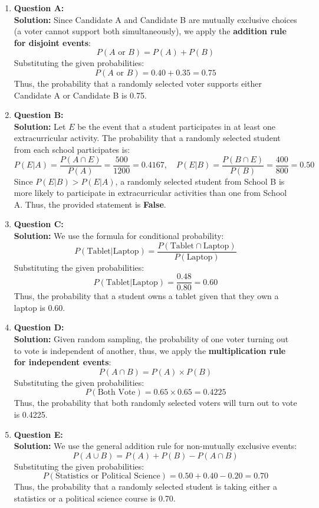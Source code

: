 \documentclass{article}
\begin{document}
\begin{enumerate}

    \item \textbf{Question A:} \\
    \textbf{Solution:} Since Candidate A and Candidate B are mutually exclusive choices (a voter cannot support both simultaneously), we apply the \textbf{addition rule for disjoint events}:
    \[
    P(A \text{ or } B) = P(A) + P(B)
    \]
    Substituting the given probabilities:
    \[
    P(A \text{ or } B) = 0.40 + 0.35 = 0.75
    \]
    Thus, the probability that a randomly selected voter supports either Candidate A or Candidate B is 0.75.

    \item \textbf{Question B:} \\
    \textbf{Solution:} Let \( E \) be the event that a student participates in at least one extracurricular activity. The probability that a randomly selected student from each school participates is:
    \[
    P(E | A) = \frac{P(A \cap E)}{P(A)} = \frac{500}{1200} = 0.4167, \quad
    P(E | B) =  \frac{P(B \cap E)}{P(B)} = \frac{400}{800} = 0.50
    \]
    Since \( P(E | B) > P(E | A) \), a randomly selected student from School B is more likely to participate in extracurricular activities than one from School A. Thus, the provided statement is \textbf{False}.

    \item \textbf{Question C:} \\
    \textbf{Solution:} We use the formula for conditional probability:
    \[
    P(\text{Tablet} | \text{Laptop}) = \frac{P(\text{Tablet} \cap \text{Laptop})}{P(\text{Laptop})}
    \]
    Substituting the given probabilities:
    \[
    P(\text{Tablet} | \text{Laptop}) = \frac{0.48}{0.80} = 0.60
    \]
    Thus, the probability that a student owns a tablet given that they own a laptop is 0.60.

    \item \textbf{Question D:} \\
    \textbf{Solution:} Given random sampling, the probability of one voter turning out to vote is independent of another, thus, we apply the \textbf{multiplication rule for independent events}:
    \[
    P(A \cap B) = P(A) \times P(B)
    \]
    Substituting the given probabilities:
    \[
    P(\text{Both Vote}) = 0.65 \times 0.65 = 0.4225
    \]
    Thus, the probability that both randomly selected voters will turn out to vote is 0.4225.

    \item \textbf{Question E:} \\
    \textbf{Solution:} We use the general addition rule for non-mutually exclusive events:
    \[
    P(A \cup B) = P(A) + P(B) - P(A \cap B)
    \]
    Substituting the given probabilities:
    \[
    P(\text{Statistics or Political Science}) = 0.50 + 0.40 - 0.20 = 0.70
    \]
    Thus, the probability that a randomly selected student is taking either a statistics or a political science course is 0.70.


\end{enumerate}
\end{document}
